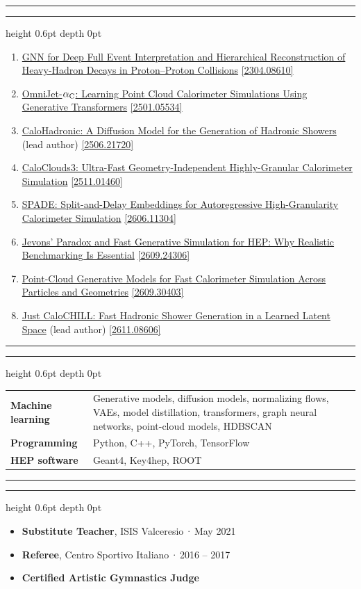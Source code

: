 \documentclass[10pt]{article}
\newcommand{\sep}{\,\textcolor{muted}{·}\,}
\newcommand{\cvsection}[1]{%
  \par\vspace{6pt}%
  {\color{accent}\rule{5pt}{5pt}}\hspace{6pt}%
  {\color{navy}\bfseries\small\textls[180]{\MakeUppercase{#1}}}\hspace{6pt}%
  {\color{rulegray}\leaders\hrule height 0.6pt depth 0pt\hfill}\par\vspace{4pt}}
\begin{document}
\cvsection{Publications}
\begin{enumerate}
  \item \href{https://arxiv.org/abs/2304.08610}{GNN for Deep Full Event Interpretation and Hierarchical Reconstruction of Heavy-Hadron Decays in Proton--Proton Collisions} \href{https://arxiv.org/abs/2304.08610}{\textcolor{muted}{[2304.08610]}}
  \item \href{https://arxiv.org/abs/2501.05534}{OmniJet-$\alpha_{\textup{C}}$: Learning Point Cloud Calorimeter Simulations Using Generative Transformers} \href{https://arxiv.org/abs/2501.05534}{\textcolor{muted}{[2501.05534]}}
  \item \href{https://arxiv.org/abs/2506.21720}{CaloHadronic: A Diffusion Model for the Generation of Hadronic Showers} (lead author) \href{https://arxiv.org/abs/2506.21720}{\textcolor{muted}{[2506.21720]}}
  \item \href{https://arxiv.org/abs/2511.01460}{CaloClouds3: Ultra-Fast Geometry-Independent Highly-Granular Calorimeter Simulation} \href{https://arxiv.org/abs/2511.01460}{\textcolor{muted}{[2511.01460]}}
  \item \href{https://arxiv.org/abs/2606.11304}{SPADE: Split-and-Delay Embeddings for Autoregressive High-Granularity Calorimeter Simulation} \href{https://arxiv.org/abs/2606.11304}{\textcolor{muted}{[2606.11304]}}
  \item \href{https://arxiv.org/abs/2609.24306}{Jevons' Paradox and Fast Generative Simulation for HEP: Why Realistic Benchmarking Is Essential} \href{https://arxiv.org/abs/2609.24306}{\textcolor{muted}{[2609.24306]}}
  \item \href{https://arxiv.org/abs/2609.30403}{Point-Cloud Generative Models for Fast Calorimeter Simulation Across Particles and Geometries} \href{https://arxiv.org/abs/2609.30403}{\textcolor{muted}{[2609.30403]}}
  \item \href{https://arxiv.org/abs/2611.08606}{Just CaloCHILL: Fast Hadronic Shower Generation in a Learned Latent Space} (lead author) \href{https://arxiv.org/abs/2611.08606}{\textcolor{muted}{[2611.08606]}}
\end{enumerate}

\cvsection{Skills}
\begin{tabularx}{\linewidth}{@{}p{3.2cm}>{\raggedright\arraybackslash}X@{}}
  \textbf{Machine learning} & Generative models, diffusion models, normalizing flows, VAEs, model distillation, transformers, graph neural networks, point-cloud models, HDBSCAN\\[1pt]
  \textbf{Programming} & Python, C++, PyTorch, TensorFlow\\[1pt]
  \textbf{HEP software} & Geant4, Key4hep, ROOT
\end{tabularx}

\cvsection{Other Experience}
\begin{itemize}
  \item \textbf{Substitute Teacher}, ISIS Valceresio\sep May 2021
  \item \textbf{Referee}, Centro Sportivo Italiano\sep 2016 -- 2017
  \item \textbf{Certified Artistic Gymnastics Judge}
\end{itemize}
\end{document}
